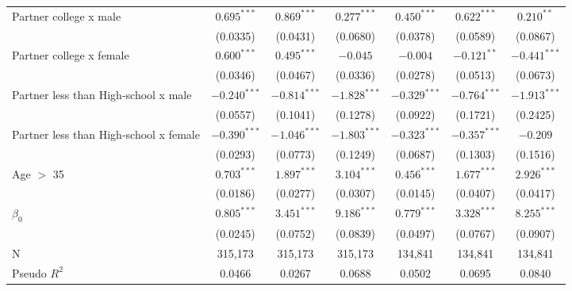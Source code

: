 \begin{tabular}{l|ccc|ccc}
Partner college x male                 &   $0.695^{***}$ &   $0.869^{***}$ &   $0.277^{***}$ &            $0.450^{***}$ &   $0.622^{***}$ &    $0.210^{**}$ \\
                                       &        (0.0335) &        (0.0431) &        (0.0680) &                 (0.0378) &        (0.0589) &        (0.0867) \\
Partner college x female               &   $0.600^{***}$ &   $0.495^{***}$ &        $-0.045$ &                 $-0.004$ &   $-0.121^{**}$ &  $-0.441^{***}$ \\
                                       &        (0.0346) &        (0.0467) &        (0.0336) &                 (0.0278) &        (0.0513) &        (0.0673) \\
Partner less than High-school x male   &  $-0.240^{***}$ &  $-0.814^{***}$ &  $-1.828^{***}$ &           $-0.329^{***}$ &  $-0.764^{***}$ &  $-1.913^{***}$ \\
                                       &        (0.0557) &        (0.1041) &        (0.1278) &                 (0.0922) &        (0.1721) &        (0.2425) \\
Partner less than High-school x female &  $-0.390^{***}$ &  $-1.046^{***}$ &  $-1.803^{***}$ &           $-0.323^{***}$ &  $-0.357^{***}$ &        $-0.209$ \\
                                       &        (0.0293) &        (0.0773) &        (0.1249) &                 (0.0687) &        (0.1303) &        (0.1516) \\
Age $>$ 35                             &   $0.703^{***}$ &   $1.897^{***}$ &   $3.104^{***}$ &            $0.456^{***}$ &   $1.677^{***}$ &   $2.926^{***}$ \\
                                       &        (0.0186) &        (0.0277) &        (0.0307) &                 (0.0145) &        (0.0407) &        (0.0417) \\
$\beta_0$                              &   $0.805^{***}$ &   $3.451^{***}$ &   $9.186^{***}$ &            $0.779^{***}$ &   $3.328^{***}$ &   $8.255^{***}$ \\
                                       &        (0.0245) &        (0.0752) &        (0.0839) &                 (0.0497) &        (0.0767) &        (0.0907) \\
N                                      &         315,173 &         315,173 &         315,173 &                  134,841 &         134,841 &         134,841 \\
Pseudo $R^2$                           &          0.0466 &          0.0267 &          0.0688 &                   0.0502 &          0.0695 &          0.0840 \\
\bottomrule
\end{tabular}
